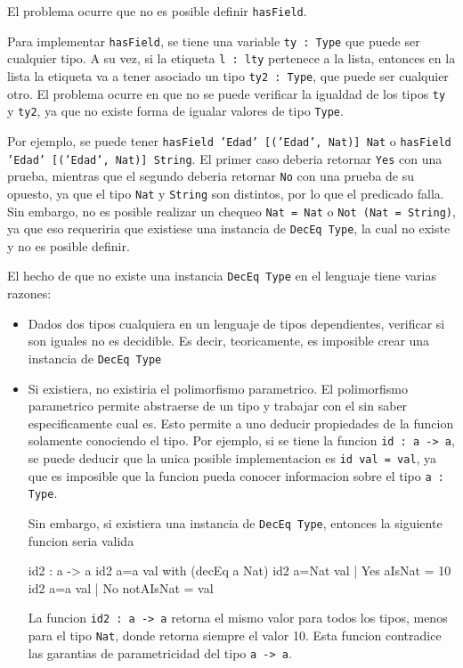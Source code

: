 El problema ocurre que no es posible definir \texttt{hasField}.

Para implementar \texttt{hasField}, se tiene una variable \texttt{ty : Type} que puede ser cualquier tipo. A su vez, si la etiqueta \texttt{l : lty} pertenece a la lista, entonces en la lista la etiqueta va a tener asociado un tipo \texttt{ty2 : Type}, que puede ser cualquier otro. El problema ocurre en que no se puede verificar la igualdad de los tipos \texttt{ty} y \texttt{ty2}, ya que no existe forma de igualar valores de tipo \texttt{Type}.

Por ejemplo, se puede tener \texttt{hasField 'Edad' [('Edad', Nat)] Nat} o \texttt{hasField 'Edad' [('Edad', Nat)] String}. El primer caso deberia retornar \texttt{Yes} con una prueba, mientras que el segundo deberia retornar \texttt{No} con una prueba de su opuesto, ya que el tipo \texttt{Nat} y \texttt{String} son distintos, por lo que el predicado falla. Sin embargo, no es posible realizar un chequeo \texttt{Nat = Nat} o \texttt{Not (Nat = String)}, ya que eso requeriria que existiese una instancia de \texttt{DecEq Type}, la cual no existe y no es posible definir.

El hecho de que no existe una instancia \texttt{DecEq Type} en el lenguaje tiene varias razones:

\begin{itemize}
\item Dados dos tipos cualquiera en un lenguaje de tipos dependientes, verificar si son iguales no es decidible. Es decir, teoricamente, es imposible crear una instancia de \texttt{DecEq Type}
\item Si existiera, no existiria el polimorfismo parametrico. El polimorfismo parametrico permite abstraerse de un tipo y trabajar con el sin saber especificamente cual es. Esto permite a uno deducir propiedades de la funcion solamente conociendo el tipo. Por ejemplo, si se tiene la funcion \texttt{id : a -> a}, se puede deducir que la unica posible implementacion es \texttt{id val = val}, ya que es imposible que la funcion pueda conocer informacion sobre el tipo \texttt{a : Type}.

Sin embargo, si existiera una instancia de \texttt{DecEq Type}, entonces la siguiente funcion seria valida

\begin{code}
id2 : a -> a
id2 {a=a} val with (decEq a Nat)
  id2 {a=Nat} val | Yes aIsNat = 10
  id2 {a=a} val | No notAIsNat = val
\end{code}

La funcion \texttt{id2 : a -> a} retorna el mismo valor para todos los tipos, menos para el tipo \texttt{Nat}, donde retorna siempre el valor 10. Esta funcion contradice las garantias de parametricidad del tipo \texttt{a -> a}.

\end{itemize}

